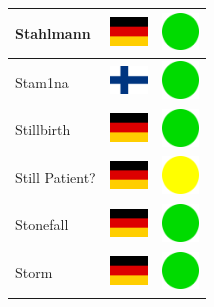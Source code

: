 \documentclass[12pt, a4paper, twoside]{report}
\begin{document}
\begin{center}
\begin{longtable}{|p{5cm}|p{2cm}|p{2cm}|}
Stahlmann & \includegraphics[width=1cm]{4x3/de} & \includegraphics[width=1cm]{likes/y} \\ \hline
Stam1na & \includegraphics[width=1cm]{4x3/fi} & \includegraphics[width=1cm]{likes/y} \\ \hline
Stillbirth & \includegraphics[width=1cm]{4x3/de} & \includegraphics[width=1cm]{likes/y} \\ \hline
Still Patient? & \includegraphics[width=1cm]{4x3/de} & \includegraphics[width=1cm]{likes/m} \\ \hline
Stonefall & \includegraphics[width=1cm]{4x3/de} & \includegraphics[width=1cm]{likes/y} \\ \hline
Storm & \includegraphics[width=1cm]{4x3/de} & \includegraphics[width=1cm]{likes/y} \\ \hline

\end{longtable}
\end{center}
\end{document}
